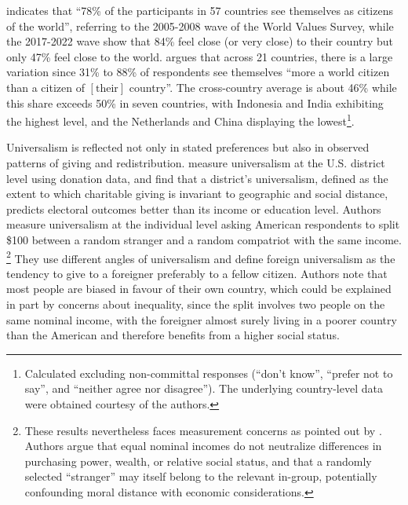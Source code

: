 \citet{bayram_2015} indicates that ``78\% of the participants in 57 countries see themselves as citizens of the world'', referring to the 2005-2008 wave of the World Values Survey, while the 2017-2022 wave %
show that 84\% feel close (or very close) to their country but only 47\% feel close to the world. 
\citet{nation_2024} argues that across 21 countries, there is a large variation since 31\% to 88\% of respondents see themselves ``more a world citizen than a citizen of $\left[ \text{their} \right]$ country''. The cross-country average is about 46\% while this share exceeds 50\% in seven countries, with Indonesia and India exhibiting the highest level, and the Netherlands and China displaying the lowest\footnote{Calculated excluding non-committal responses (``don't know'', ``prefer not to say'', and ``neither agree nor disagree''). The underlying country-level data were obtained courtesy of the authors.}. %

Universalism is reflected not only in stated preferences but also in observed patterns of giving and redistribution. \citet{enke_universalism_2024} measure universalism at the U.S. district level using donation data, and find that a district's universalism, defined as the extent to which charitable giving is invariant to geographic and social distance, predicts electoral outcomes better than its income or education level. Authors %
measure universalism at the individual level asking American respondents to split \$100 between a random stranger and a random compatriot %
with the same income.%
\footnote{These results nevertheless faces measurement concerns as pointed out by  \citet{boyer-kassem_how_2026}. Authors argue that equal nominal incomes do not neutralize differences in purchasing power, wealth, or relative social status, and that a randomly selected ``stranger'' may itself belong to the relevant in-group, potentially confounding moral distance with economic considerations.} %
They use different angles of universalism and define foreign universalism as the tendency to give to a foreigner preferably to a fellow citizen. Authors note that most %
people are biased in favour of their own country, which could be explained in part by concerns about inequality, since the split involves two people on the same nominal income, with the foreigner almost surely living in a poorer country than the American and therefore benefits from a higher social status. 

